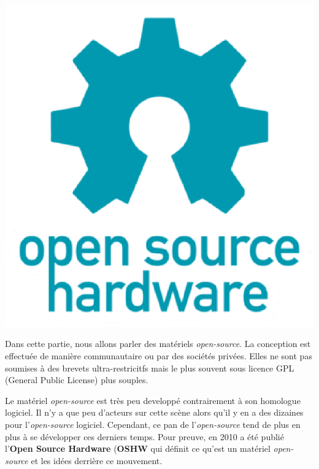  \begin{minipage}{0.40\linewidth}
 \includegraphics[scale=0.3]{oshw-logo.eps}
 \end{minipage}\hfill
 \begin{minipage}{0.55\linewidth}
Dans cette partie, nous allons parler des matériels \textit{open-source}. La conception est effectuée de manière communautaire ou par des sociétés privées. Elles ne sont pas soumises à des brevets ultra-restricitfs mais le plus souvent sous licence GPL (General Public License) plus souples. 
 \end{minipage}
Le matériel \textit{open-source} est très peu developpé contrairement à son homologue logiciel. Il n'y a que peu d'acteurs sur cette scène alors qu'il y en a des dizaines pour l'\textit{open-source} logiciel. Cependant, ce pan de l'\textit{open-source} tend de plus en plus à se développer ces derniers temps. Pour preuve, en 2010 a été publié l'\textbf{Open Source Hardware} (\textbf{OSHW} qui définit ce qu'est un matériel \textit{open-source} et les idées derrière ce mouvement.


